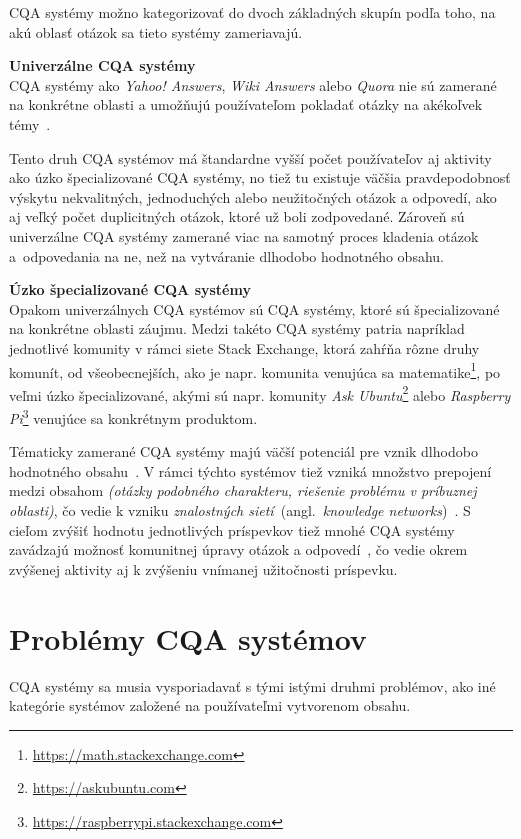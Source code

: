 CQA systémy možno kategorizovať do dvoch základných skupín podľa toho, na akú oblasť otázok sa tieto systémy zameriavajú.

\textbf{Univerzálne CQA systémy}\\
CQA systémy ako \emph{Yahoo! Answers}, \emph{Wiki Answers} alebo \emph{Quora} nie sú zamerané na konkrétne oblasti
a umožňujú používateľom pokladať otázky na akékoľvek témy~\cite{Chua2014}.

Tento druh CQA systémov má štandardne vyšší počet používateľov aj aktivity ako úzko špecializované CQA systémy,
no tiež tu existuje väčšia pravdepodobnosť výskytu nekvalitných, jednoduchých alebo neužitočných otázok a odpovedí,
ako aj veľký počet duplicitných otázok, ktoré už boli zodpovedané. Zároveň sú univerzálne CQA systémy zamerané viac
na samotný proces kladenia otázok a~odpovedania na ne, než na vytváranie dlhodobo hodnotného obsahu.

\textbf{Úzko špecializované CQA systémy}\\
Opakom univerzálnych CQA systémov sú CQA systémy, ktoré sú špecializované na konkrétne oblasti záujmu.
Medzi takéto CQA systémy patria napríklad jednotlivé komunity v rámci siete Stack Exchange, ktorá zahŕňa rôzne druhy
komunít, od všeobecnejších, ako je napr. komunita venujúca sa matematike\footnote{\url{https://math.stackexchange.com}},
po veľmi úzko špecializované, akými sú napr. komunity \emph{Ask Ubuntu}\footnote{\url{https://askubuntu.com}} alebo
\emph{Raspberry Pi}\footnote{\url{https://raspberrypi.stackexchange.com}} venujúce sa konkrétnym produktom.

Tématicky zamerané CQA systémy majú väčší potenciál pre vznik dlhodobo hodnotného obsahu~\cite{Anderson2012}. V rámci
týchto systémov tiež vzniká množstvo prepojení medzi obsahom \textit{(otázky podobného charakteru, riešenie problému
v príbuznej oblasti)}, čo vedie k vzniku \emph{znalostných sietí}~(angl.~\emph{knowledge networks})~\cite{Li2016}.
S cieľom zvýšiť hodnotu jednotlivých príspevkov tiež mnohé CQA systémy zavádzajú možnosť komunitnej úpravy
otázok a odpovedí~\cite{Li2015}, čo vedie okrem zvýšenej aktivity aj k zvýšeniu vnímanej užitočnosti príspevku.


\section{Problémy CQA systémov}

CQA systémy sa musia vysporiadavať s tými istými druhmi problémov, ako iné kategórie systémov založené na používateľmi
vytvorenom obsahu.

